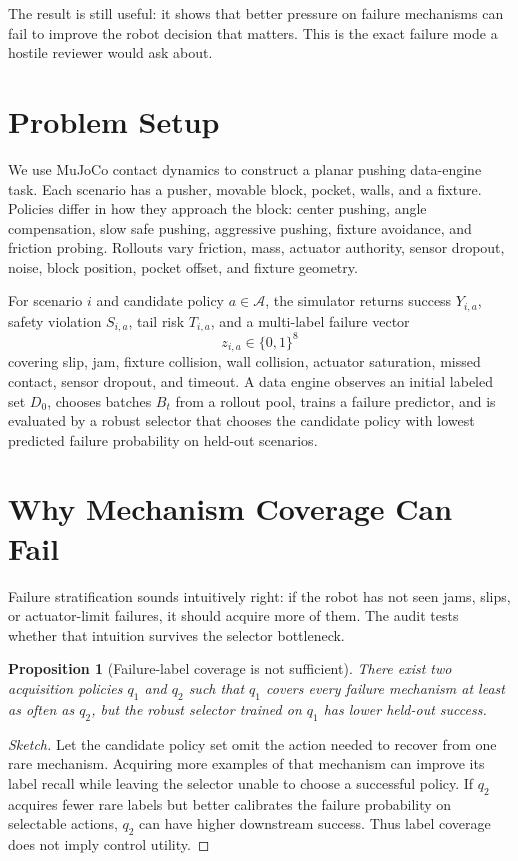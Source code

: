 \documentclass{article}
\newtheorem{proposition}{Proposition}
\begin{document}
The result is still useful: it shows that better pressure on failure mechanisms can fail to improve the robot decision that matters. This is the exact failure mode a hostile reviewer would ask about.

\section{Problem Setup}
We use MuJoCo contact dynamics \citep{todorov2012mujoco} to construct a planar pushing data-engine task. Each scenario has a pusher, movable block, pocket, walls, and a fixture. Policies differ in how they approach the block: center pushing, angle compensation, slow safe pushing, aggressive pushing, fixture avoidance, and friction probing. Rollouts vary friction, mass, actuator authority, sensor dropout, noise, block position, pocket offset, and fixture geometry.

For scenario $i$ and candidate policy $a \in \mathcal{A}$, the simulator returns success $Y_{i,a}$, safety violation $S_{i,a}$, tail risk $T_{i,a}$, and a multi-label failure vector
\[
  z_{i,a} \in \{0,1\}^8
\]
covering slip, jam, fixture collision, wall collision, actuator saturation, missed contact, sensor dropout, and timeout. A data engine observes an initial labeled set $D_0$, chooses batches $B_t$ from a rollout pool, trains a failure predictor, and is evaluated by a robust selector that chooses the candidate policy with lowest predicted failure probability on held-out scenarios.

\section{Why Mechanism Coverage Can Fail}
Failure stratification sounds intuitively right: if the robot has not seen jams, slips, or actuator-limit failures, it should acquire more of them. The audit tests whether that intuition survives the selector bottleneck.

\begin{proposition}[Failure-label coverage is not sufficient]
There exist two acquisition policies $q_1$ and $q_2$ such that $q_1$ covers every failure mechanism at least as often as $q_2$, but the robust selector trained on $q_1$ has lower held-out success.
\end{proposition}
\begin{proof}[Sketch]
Let the candidate policy set omit the action needed to recover from one rare mechanism. Acquiring more examples of that mechanism can improve its label recall while leaving the selector unable to choose a successful policy. If $q_2$ acquires fewer rare labels but better calibrates the failure probability on selectable actions, $q_2$ can have higher downstream success. Thus label coverage does not imply control utility.
\end{proof}
\end{document}
